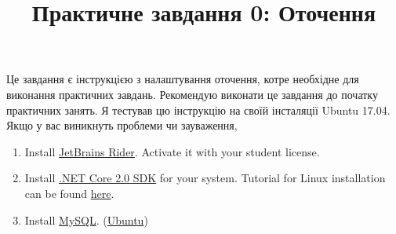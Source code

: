 \documentclass[12pt]{article}
\begin{document}
\title{Практичне завдання 0: Оточення}
\maketitle

Це завдання є інструкцією з налаштування оточення, котре необхідне для виконання практичних завдань. Рекомендую виконати це завдання до початку практичних занять. Я тестував цю інструкцію на своїй інсталяції Ubuntu 17.04. Якщо у вас виникнуть проблеми чи зауваження, 

\begin{enumerate}  
\item Install \href{https://www.jetbrains.com/rider/download/}{JetBrains Rider}. Activate it with your student license.
\item Install \href{https://www.microsoft.com/net/learn/get-started}{.NET Core 2.0 SDK} for your system. Tutorial for Linux installation can be found \href{https://docs.microsoft.com/ru-ru/dotnet/core/linux-prerequisites?tabs=netcore2x}{here}.
\item Install \href{https://www.mysql.com/}{MySQL}. (\href{https://www.digitalocean.com/community/tutorials/how-to-install-mysql-on-ubuntu-16-04}{Ubuntu})


\end{enumerate}
\end{document}
